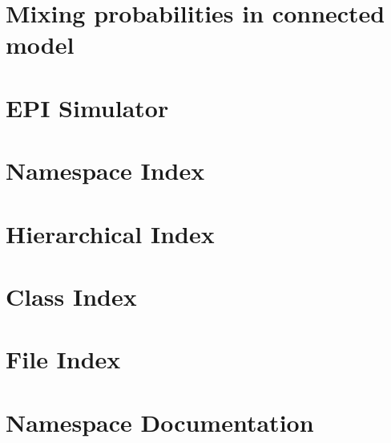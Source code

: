 \let\mypdfximage\pdfximage\def\pdfximage{\immediate\mypdfximage}\documentclass[twoside]{book}
\newcommand{\+}{\discretionary{\mbox{\scriptsize$\hookleftarrow$}}{}{}}
\begin{document}
\chapter{Mixing probabilities in connected model}
\label{md_paper_mixing}

\chapter{EPI Simulator}
\label{md__r_e_a_d_m_e_old}

\chapter{Namespace Index}

\chapter{Hierarchical Index}

\chapter{Class Index}

\chapter{File Index}

\chapter{Namespace Documentation}


\end{document}
